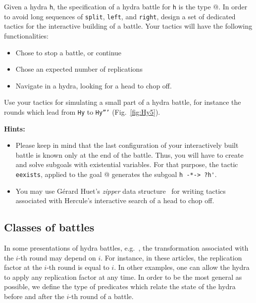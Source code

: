 \documentclass[a4paper]{book}
\begin{document}

\begin{exercise}
\label{exo:interactive-battle}
Given a hydra \texttt{h}, the specification of a hydra battle for \texttt{h} is the type 
@. In order to avoid long sequences of \texttt{split}, \texttt{left}, and 
\texttt{right}, design a set of dedicated tactics for the interactive building of a battle.
Your tactics will have the following functionalities:
\begin{itemize}
\item  Chose to stop a battle, or continue
\item Chose an expected number of replications
\item Navigate in a hydra, looking for a head to chop off.
\end{itemize}

Use your tactics for simulating a small part of a hydra battle, for instance the rounds which lead from
\texttt{Hy} to \texttt{Hy'''}  (Fig.~\vref{fig:Hy5}).

\textbf{Hints:} 
\begin{itemize}

\item Please keep in mind that the last  configuration of your interactively built battle is known only at the end of the battle. Thus, you will have to create and solve subgoals with existential variables. For that purpose, the tactic \texttt{eexists}, applied to the 
goal @ generates the subgoal \Verb|h -*-> ?h'|.
\item You may use Gérard Huet's \emph{zipper} data structure~\cite{zipper} for writing tactics associated with Hercule's  interactive search of a head to chop off.
\end{itemize}






\end{exercise}




\subsection{Classes of battles}
\label{sect:battle-classes}

In some presentations of hydra battles, e.g.~\cite{KP82, bauer2008}, the transformation associated with the $i$-th round may depend on $i$. For instance, in these articles, the replication factor at the $i$-th round is equal to $i$. In other examples, one can allow the hydra to apply any replication factor at any time. In order to be the most general as possible, we define the type of predicates which relate the state of the hydra before and after the $i$-th round of a battle.
\end{document}
